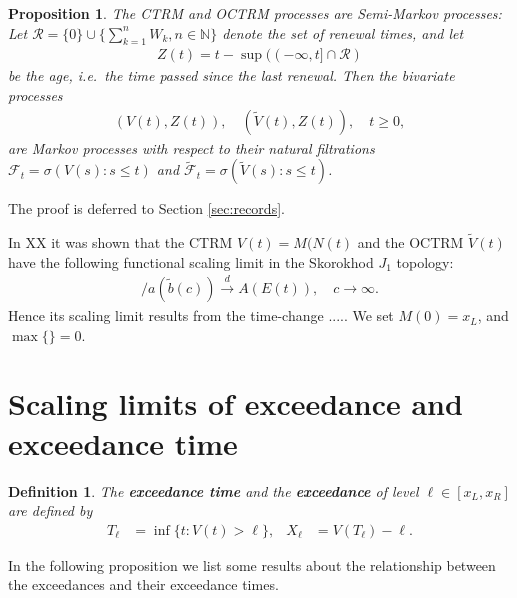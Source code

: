 \documentclass[12pt]{article}
\newtheorem{proposition}[equation]{Proposition}
\newtheorem{definition}[equation]{Definition}
\newcommand{\1}{\mathbf 1}
\begin{document}
\begin{proposition}
The CTRM and OCTRM processes are Semi-Markov processes: 
Let $\mathcal R = \{0\} \cup \{\sum_{k=1}^n W_k, n \in \mathbb N\}$ denote the set of renewal times, and let 
\begin{align*}
Z(t) = t - \sup((-\infty, t] \cap \mathcal R)
\end{align*}
be the \emph{age}, i.e.\ the time passed since the last renewal. Then the bivariate processes 
\begin{align*}
(V(t), Z(t)), \quad (\tilde V(t), Z(t)), \quad t \ge 0,
\end{align*}
are Markov processes with respect to their natural filtrations $\mathcal F_t = \sigma(V(s): s \le t)$ and $\tilde{\mathcal F}_t = \sigma(\tilde V(s): s \le t)$. 
\end{proposition}

The proof is deferred to Section \ref{sec:records}.

In XX it was shown that the CTRM $V(t) = M(N(t)$ and the OCTRM $\tilde V(t)$ have the following functional scaling limit in the Skorokhod $J_1$ topology: 
\begin{align*}
[V(ct) - d(\tilde b(c))] / a(\tilde b(c)) \stackrel{d}{\to} 
A(E(t)), \quad c \to \infty.
\end{align*}
Hence its scaling limit results from the time-change .....
We set $M(0) = x_L$, and $\max\{\} = 0$. 



\section{Scaling limits of exceedance and exceedance time}

\begin{definition}
The \textbf{exceedance time} and the \textbf{exceedance} of level $\ell \in [x_L,x_R]$ are
defined by
\begin{align*}
T_\ell &= \inf\{t: V(t) > \ell\}, 
&
X_\ell &= V(T_\ell) - \ell .
\end{align*}
\end{definition}

In the following proposition we list some results about the relationship between the exceedances and their exceedance times.
\end{document}
